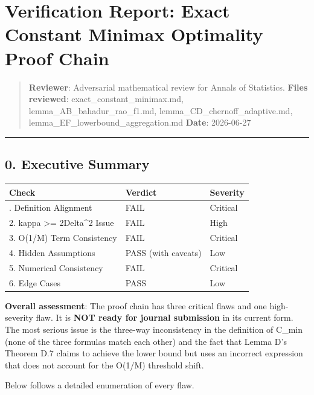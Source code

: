 \documentclass[
  12pt,
]{article}
\author{SCX}
\date{2026}
\begin{document}
\section{Verification Report: Exact Constant Minimax Optimality Proof
Chain}\label{verification-report-exact-constant-minimax-optimality-proof-chain}

\begin{quote}
\textbf{Reviewer}: Adversarial mathematical review for Annals of
Statistics. \textbf{Files reviewed}: exact\_constant\_minimax.md,
lemma\_AB\_bahadur\_rao\_f1.md, lemma\_CD\_chernoff\_adaptive.md,
lemma\_EF\_lowerbound\_aggregation.md \textbf{Date}: 2026-06-27
\end{quote}

\begin{center}\rule{0.5\linewidth}{0.5pt}\end{center}

\subsection{0. Executive Summary}\label{executive-summary}

\begin{longtable}[]{@{}lll@{}}
\toprule\noalign{}
Check & Verdict & Severity \\
\midrule\noalign{}
\endhead
\bottomrule\noalign{}
\endlastfoot
1. Definition Alignment & FAIL & Critical \\
2. kappa \textgreater= 2Delta\^{}2 Issue & FAIL & High \\
3. O(1/M) Term Consistency & FAIL & Critical \\
4. Hidden Assumptions & PASS (with caveats) & Low \\
5. Numerical Consistency & FAIL & Critical \\
6. Edge Cases & PASS & Low \\
\end{longtable}

\textbf{Overall assessment}: The proof chain has three critical flaws
and one high-severity flaw. It is \textbf{NOT ready for journal
submission} in its current form. The most serious issue is the three-way
inconsistency in the definition of C\_min (none of the three formulas
match each other) and the fact that Lemma D's Theorem D.7 claims to
achieve the lower bound but uses an incorrect expression that does not
account for the O(1/M) threshold shift.

Below follows a detailed enumeration of every flaw.
\end{document}
